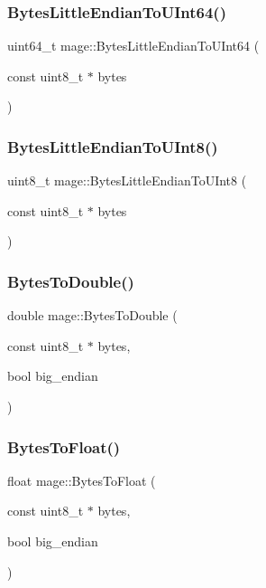 \subsubsection{\texorpdfstring{Bytes\+Little\+Endian\+To\+U\+Int64()}{BytesLittleEndianToUInt64()}}
{\footnotesize\ttfamily uint64\+\_\+t mage\+::\+Bytes\+Little\+Endian\+To\+U\+Int64 (\begin{DoxyParamCaption}\item[{const uint8\+\_\+t $\ast$}]{bytes }\end{DoxyParamCaption})}

\hypertarget{namespacemage_ac06182df9bf408e6de663497d9760724}{}\label{namespacemage_ac06182df9bf408e6de663497d9760724} 
\subsubsection{\texorpdfstring{Bytes\+Little\+Endian\+To\+U\+Int8()}{BytesLittleEndianToUInt8()}}
{\footnotesize\ttfamily uint8\+\_\+t mage\+::\+Bytes\+Little\+Endian\+To\+U\+Int8 (\begin{DoxyParamCaption}\item[{const uint8\+\_\+t $\ast$}]{bytes }\end{DoxyParamCaption})}

\hypertarget{namespacemage_af85b8ba1e336f37fc8fe34a53e981a6c}{}\label{namespacemage_af85b8ba1e336f37fc8fe34a53e981a6c} 
\subsubsection{\texorpdfstring{Bytes\+To\+Double()}{BytesToDouble()}}
{\footnotesize\ttfamily double mage\+::\+Bytes\+To\+Double (\begin{DoxyParamCaption}\item[{const uint8\+\_\+t $\ast$}]{bytes,  }\item[{bool}]{big\+\_\+endian }\end{DoxyParamCaption})}

\hypertarget{namespacemage_a5e41913a3a1613add8511e5834e09277}{}\label{namespacemage_a5e41913a3a1613add8511e5834e09277} 
\subsubsection{\texorpdfstring{Bytes\+To\+Float()}{BytesToFloat()}}
{\footnotesize\ttfamily float mage\+::\+Bytes\+To\+Float (\begin{DoxyParamCaption}\item[{const uint8\+\_\+t $\ast$}]{bytes,  }\item[{bool}]{big\+\_\+endian }\end{DoxyParamCaption})}

